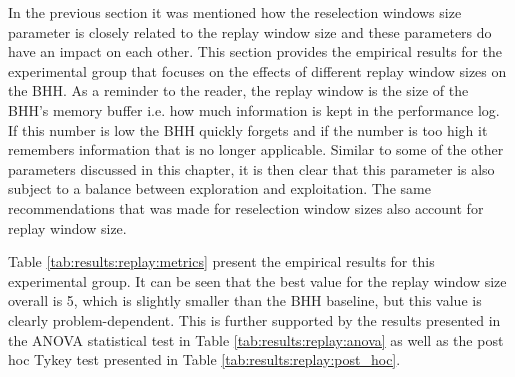 In the previous section it was mentioned how the reselection windows size parameter is closely related to the replay window size and these parameters do have an impact on each other. This section provides the empirical results for the experimental group that focuses on the effects of different replay window sizes on the \Ac{BHH}. As a reminder to the reader, the replay window is the size of the \Ac{BHH}'s memory buffer i.e. how much information is kept in the performance log. If this number is low the \Ac{BHH} quickly forgets and if the number is too high it remembers information that is no longer applicable. Similar to some of the other parameters discussed in this chapter, it is then clear that this parameter is also subject to a balance between exploration and exploitation. The same recommendations that was made for reselection window sizes also account for replay window size.

Table \ref{tab:results:replay:metrics} present the empirical results for this experimental group. It can be seen that the best value for the replay window size overall is 5, which is slightly smaller than the \Ac{BHH} baseline, but this value is clearly problem-dependent. This is further supported by the results presented in the ANOVA statistical test in Table \ref{tab:results:replay:anova} as well as the post hoc Tykey test presented in Table \ref{tab:results:replay:post_hoc}.

